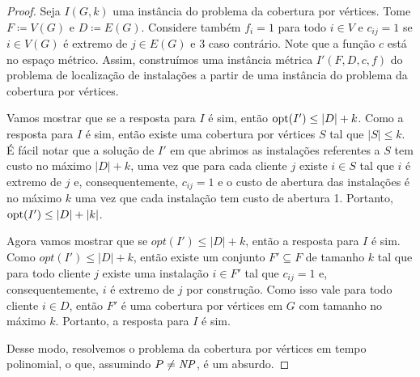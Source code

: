 \begin{proof}

    Seja $I(G,k)$ uma instância do problema da cobertura por vértices. Tome $F \coloneqq V(G)$ e $D \coloneqq E(G)$. Considere também $f_i = 1$ para todo $i \in V$ e $c_{ij} = 1$ se $i \in V(G)$ é extremo de $j \in E(G)$ e 3 caso contrário. Note que a função $c$ está no espaço métrico. Assim, construímos uma instância métrica $I'(F,D,c,f)$ do problema de localização de instalações a partir de uma instância do problema da cobertura por vértices.


    Vamos mostrar que se a resposta para $I$ é sim, então $\mathrm{opt}(I') \leq |D| + k$. Como a resposta para $I$ é sim, então existe uma cobertura por vértices $S$ tal que $|S|\leq k$. É fácil notar que a solução de $I'$ em que abrimos as instalações referentes a $S$ tem custo no máximo $|D| + k$, uma vez que para cada cliente $j$ existe $i \in S$ tal que $i$ é extremo de $j$ e, consequentemente, $c_{ij} = 1$ e o custo de abertura das instalações é no máximo $k$ uma vez que cada instalação tem custo de abertura 1. Portanto, $\mathrm{opt}(I') \leq |D| + |k|$.

    Agora vamos mostrar que se $opt(I') \leq |D| + k$, então a resposta para $I$ é sim. Como $opt(I') \leq |D| + k$, então existe um conjunto $F' \subseteq F$ de tamanho $k$ tal que para todo cliente $j$ existe uma instalação $i \in F'$ tal que $c_{ij} = 1$ e, consequentemente, $i$ é extremo de $j$ por construção. Como isso vale para todo cliente $i \in D$, então $F'$ é uma cobertura por vértices em $G$ com tamanho no máximo $k$. Portanto, a resposta para $I$ é sim.

    Desse modo, resolvemos o problema da cobertura por vértices em tempo polinomial, o que, assumindo $P\neq\mathit{NP}$, é um absurdo.
\end{proof}